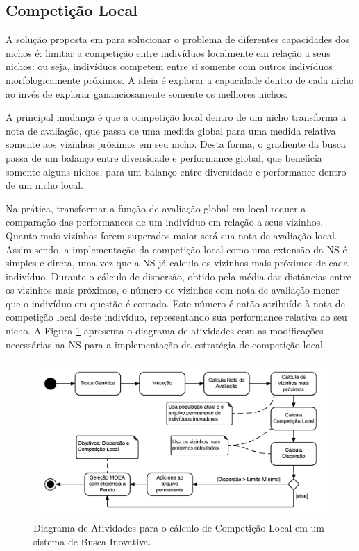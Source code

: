 \subsection{Competição Local}

A solução proposta em \cite{lehman2011evolving} para solucionar o problema de diferentes capacidades dos nichos é: limitar a competição entre indivíduos localmente em relação a seus nichos; ou seja, indivíduos competem entre si somente com outros indivíduos morfologicamente próximos. A ideia é explorar a capacidade dentro de cada nicho ao invés de explorar gananciosamente somente os melhores nichos.

A principal mudança é que a competição local dentro de um nicho transforma a nota de avaliação, que passa de uma medida global para uma medida relativa somente aos vizinhos próximos em seu nicho. Desta forma, o gradiente da busca passa de um balanço entre diversidade e performance global, que beneficia somente alguns nichos, para um balanço entre diversidade e performance dentro de um nicho local.

Na prática, transformar a função de avaliação global em local requer a comparação das performances de um indivíduo em relação a seus vizinhos. Quanto mais vizinhos forem superados maior será sua nota de avaliação local. Assim sendo, a implementação da competição local como uma extensão da NS é simples e direta, uma vez que a NS já calcula os vizinhos mais próximos de cada indivíduo. Durante o cálculo de dispersão, obtido pela média das distâncias entre os vizinhos mais próximos, o número de vizinhos com nota de avaliação menor que o indivíduo em questão é contado. Este número é então atribuído à nota de competição local deste indivíduo, representando sua performance relativa ao seu nicho. A Figura \ref{fig:local_comp_diag} apresenta o diagrama de atividades com as modificações necessárias na NS para a implementação da estratégia de competição local.

\begin{figure}[htb]
	\begin{center}
		\includegraphics[width=1.0\textwidth]{Imagens/local_comp_diag.png}
		\caption{Diagrama de Atividades para o cálculo de Competição Local em um sistema de Busca Inovativa.}
		\label{fig:local_comp_diag}
	\end{center}
\end{figure}

